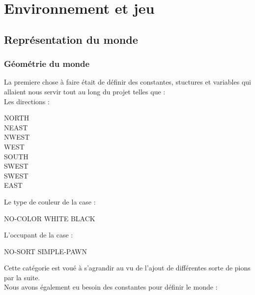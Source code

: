 \chapter{Environnement et jeu}

\section{Représentation du monde}
    \subsection{Géométrie du monde}
        La premiere chose à faire était de définir des constantes, stuctures et variables qui allaient nous servir tout au long du projet telles que : \\
        
        \noindent Les directions :
        \begin{center}
            \begin{multicols}{2}
                NORTH \\ NEAST \\ NWEST \\ WEST \\ SOUTH \\ SWEST \\ SWEST \\ EAST
            \end{multicols}
        \end{center}
        
        \noindent Le type de couleur de la case :
        \begin{center}
            NO-COLOR \hspace{1cm} WHITE \hspace{1cm} BLACK \\
        \end{center}
        \noindent L'occupant de la case :
        \begin{center}
            NO-SORT \hspace{2cm} SIMPLE-PAWN \\ 
        \end{center}
        
        \noindent Cette catégorie est voué à s'agrandir au vu de l'ajout de différentes sorte de pions par la suite. \\
        
        \noindent Nous avons également eu besoin des constantes pour définir le monde : \\
        

